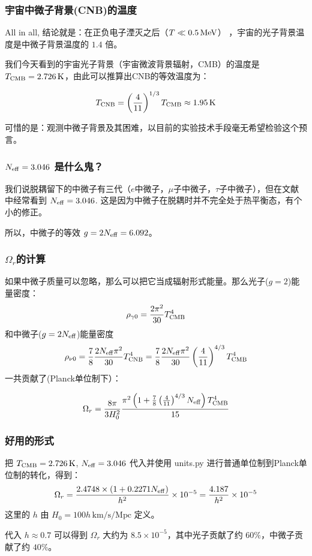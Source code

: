 \documentclass[CJK,13pt]{beamer}
\begin{document}
  \begin{frame}
    \frametitle{宇宙中微子背景(CNB)的温度}

    All in all, 结论就是：在正负电子湮灭之后（$T\ll 0.5\,\mathrm{MeV}$） ，宇宙的光子背景温度是中微子背景温度的 $1.4$ 倍。
    
    我们今天看到的宇宙光子背景（宇宙微波背景辐射，CMB）的温度是 $T_{\rm CMB} = 2.726 \,\mathrm{K}$，由此可以推算出CNB的等效温度为：

    $$ T_{\rm CNB} = \left(\frac{4}{11}\right)^{1/3}T_{\rm CMB} \approx 1.95\,\mathrm{K}$$

    可惜的是：观测中微子背景及其困难，以目前的实验技术手段毫无希望检验这个预言。
  \end{frame}

  \begin{frame}
    \frametitle{$N_{\rm eff}=3.046$ 是什么鬼？}
    我们说脱耦留下的中微子有三代（$e$中微子，$\mu$子中微子，$\tau$子中微子），但在文献中经常看到 $N_{\rm eff} = 3.046$. 这是因为中微子在脱耦时并不完全处于热平衡态，有个小的修正。

    \skiplines
    
    所以，中微子的等效 $g = 2N_{\rm eff} = 6.092$。
  \end{frame}

  
  \begin{frame}
    \frametitle{$\Omega_r$的计算}
    如果中微子质量可以忽略，那么可以把它当成辐射形式能量。那么光子($g=2$)能量密度：
    $$\rho_{\gamma 0} = \frac{2\pi^2}{30}T_{\rm CMB}^4 $$
    和中微子($g=2N_{\rm eff}$)能量密度
    $$\rho_{\nu 0} = \frac{7}{8}\frac{2N_{\rm eff}\pi^2}{30}T_{\rm CNB}^4 = \frac{7}{8}\frac{2N_{\rm eff}\pi^2}{30}\left(\frac{4}{11}\right)^{4/3}T_{\rm CMB}^4  $$
    一共贡献了(Planck单位制下）：

      $$\Omega_r = \frac{8\pi}{3H_0^2} \frac{\pi^2\left(1+\frac{7}{8}\left(\frac{4}{11}\right)^{4/3}N_{\rm eff}\right)T_{\rm CMB}^4}{15}$$
  \end{frame}

  \begin{frame}
    \frametitle{好用的形式}
    把 $T_{\rm CMB}=2.726\,\mathrm{K}$, $N_{\rm eff}=3.046$ 代入并使用 units.py 进行普通单位制到Planck单位制的转化，得到： 
    $$\Omega_r  = \frac{2.4748\times(1+0.2271N_{\rm eff})}{h^2}\times 10^{-5}=\frac{4.187}{h^2}\times 10^{-5}$$
    这里的 $h$ 由 $H_0 = 100h\,\mathrm{km/s/Mpc}$ 定义。

    \skipline
    
    代入 $h\approx 0.7$ 可以得到 $\Omega_r$ 大约为 $8.5\times 10^{-5}$，其中光子贡献了约 $60\%$，中微子贡献了约 $40\%$。
  \end{frame}
\end{document}
